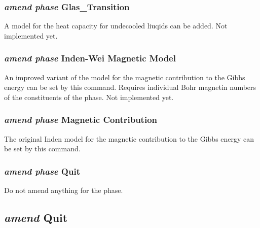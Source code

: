 \documentclass[12pt]{article}
\begin{document}
\subsubsection{{\em amend phase} Glas\_Transition}

A model for the heat capacity for undecooled liuqids can be added.
Not implemented yet.

\subsubsection{{\em amend phase} Inden-Wei Magnetic Model}

An improved variant of the model for the magnetic contribution to the
Gibbs energy can be set by this command.  Requires individual Bohr
magnetin numbers of the constituents of the phase.  Not implemented
yet.

\subsubsection{{\em amend phase} Magnetic Contribution}

The original Inden model for the magnetic contribution to the Gibbs
energy can be set by this command.

\subsubsection{{\em amend phase} Quit}

Do not amend anything for the phase.

\subsection{{\em amend} Quit}
\end{document}
